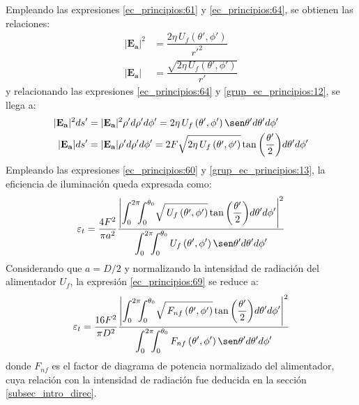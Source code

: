 Empleando las expresiones \eqref{ec_principios:61} y \eqref{ec_principios:64}, se obtienen las relaciones:
\begin{subequations}
\label{grup_ec_principios:12}
\begin{align}
\lvert\mathbf{E_a}\rvert ^2 &= \dfrac{2\eta\,U_f\left(\theta ',\phi '\right)}{{r'}^2}
\label{ec_principios:65}\\
\lvert\mathbf{E_a}\rvert &= \dfrac{\sqrt{2\eta\,U_f\left(\theta ',\phi '\right)}}{r'}
\label{ec_principios:66}
\end{align}
\end{subequations}
y relacionando las expresiones \eqref{ec_principios:64} y \eqref{grup_ec_principios:12}, se llega a:
\begin{subequations}
\label{grup_ec_principios:13}
\begin{align}
\lvert\mathbf{E_a}\rvert ^2ds' &= \lvert\mathbf{E_a}\rvert ^2\rho 'd\rho 'd\phi ' = 2\eta\,U_f\left(\theta ',\phi '\right)\sen\theta 'd\theta 'd\phi '
\label{ec_principios:67}\\
\lvert\mathbf{E_a}\rvert ds' &= \lvert\mathbf{E_a}\rvert \rho 'd\rho 'd\phi ' = 2F\sqrt{2\eta\,U_f\left(\theta ',\phi '\right)}\tan\left(\frac{\theta '}{2}\right)\!d\theta 'd\phi '
\label{ec_principios:68}
\end{align}
\end{subequations}
Empleando las expresiones \eqref{ec_principios:60} y \eqref{grup_ec_principios:13}, la eficiencia de iluminación queda expresada como:
\begin{align}
\varepsilon_t  = \dfrac{4F^2}{\pi a^2}\dfrac{\left|\displaystyle\int_0^{2\pi}\!\!\!\int_0^{\theta_0}\! \sqrt{\,U_f\left(\theta ',\phi '\right)}\tan\left(\frac{\theta '}{2}\right)\!d\theta 'd\phi '\right|^2}{\displaystyle\int_0^{2\pi}\!\!\!\int_0^{\theta_0}U_f\left(\theta ',\phi '\right)\sen\theta 'd\theta 'd\phi '}
\label{ec_principios:69}
\end{align}
Considerando que $a = D/2$ y normalizando la intensidad de radiación del alimentador $U_f$, la expresión \eqref{ec_principios:69} se reduce a:
\begin{align}
\varepsilon_t  = \dfrac{16F^2}{\pi D^2}\dfrac{\left|\displaystyle\int_0^{2\pi}\!\!\!\int_0^{\theta_0}\! \sqrt{\,F_{nf}\left(\theta ',\phi '\right)}\tan\left(\frac{\theta '}{2}\right)\!d\theta 'd\phi '\right|^2}{\displaystyle\int_0^{2\pi}\!\!\!\int_0^{\theta_0}F_{nf}\left(\theta ',\phi '\right)\sen\theta 'd\theta 'd\phi '}
\label{ec_principios:70}
\end{align}
donde $F_{nf}$ es el factor de diagrama de potencia normalizado del alimentador, cuya relación con la intensidad de radiación fue deducida en la sección \ref{subsec_intro_direc}.

